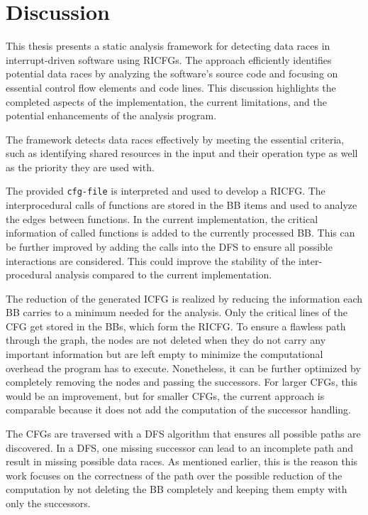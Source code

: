 \documentclass[
fancyheadings, %
%
%
]{stsreprt}
\begin{document}
{ 
 \chapter{Discussion}
This thesis presents a static analysis framework for detecting data races in interrupt-driven software using \aclp{RICFG}. The approach efficiently identifies potential data races by analyzing the software's source code and focusing on essential control flow elements and code lines. This discussion highlights the completed aspects of the implementation, the current limitations, and the potential enhancements of the analysis program.

The framework detects data races effectively by meeting the essential criteria, such as identifying shared resources in the input and their operation type as well as the priority they are used with.

The provided \texttt{cfg-file} is interpreted and used to develop a \acl{RICFG}. The interprocedural calls of functions are stored in the \acl{BB} items and used to analyze the edges between functions. In the current implementation, the critical information of called functions is added to the currently processed \ac{BB}. This can be further improved by adding the calls into the \ac{DFS} to ensure all possible interactions are considered. This could improve the stability of the inter-procedural analysis compared to the current implementation.

The reduction of the generated \ac{ICFG} is realized by reducing the information each \acl{BB} carries to a minimum needed for the analysis. Only the critical lines of the \ac{CFG} get stored in the \aclp{BB}, which form the \ac{RICFG}. To ensure a flawless path through the graph, the nodes are not deleted when they do not carry any important information but are left empty to minimize the computational overhead the program has to execute. Nonetheless, it can be further optimized by completely removing the nodes and passing the successors. For larger \acp{CFG}, this would be an improvement, but for smaller \acp{CFG}, the current approach is comparable because it does not add the computation of the successor handling.

The \acp{CFG} are traversed with a \ac{DFS} algorithm that ensures all possible paths are discovered. In a \ac{DFS}, one missing successor can lead to an incomplete path and result in missing possible data races. As mentioned earlier, this is the reason this work focuses on the correctness of the path over the possible reduction of the computation by not deleting the \ac{BB} completely and keeping them empty with only the successors.

}
\end{document}
